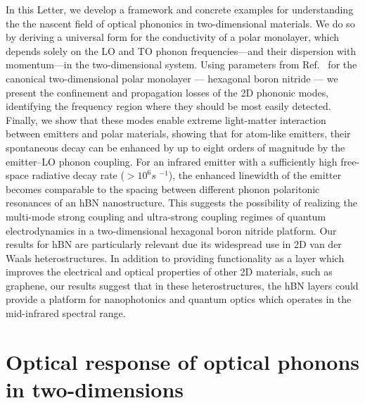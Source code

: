 \documentclass[aps,prb,twocolumn,
	           groupedaddress,superscriptaddress,
               amsfonts,amssymb,amsmath,floatfix,
	           citeautoscript]{revtex4-1}
\newcommand{\comment}[2]{%
    \ifbool{togglecomments}%
    {\textcolor{blue!70!black}{\small\textsf{%
    \textsuperscript{\textsc{\textsf{\MakeLowercase{#1}}}}%
    [#2]}}} %
    {}}     %
\begin{document}
In this Letter, we develop a framework and concrete examples for understanding the the nascent field of optical phononics in two-dimensional materials. We do so by deriving a universal form for the conductivity of a polar monolayer,  which depends solely on the LO and TO phonon frequencies---and their dispersion with momentum---in the two-dimensional system. Using parameters from Ref.~ for the canonical two-dimensional polar monolayer --- hexagonal boron nitride --- we present the confinement and propagation losses of the 2D phononic modes, identifying the frequency region where they should be most easily detected. Finally, we show that these modes enable extreme light-matter interaction between emitters and polar materials, showing that for atom-like emitters, their spontaneous decay can be enhanced by up to eight orders of magnitude by the emitter--LO phonon coupling. For an infrared emitter with a sufficiently high free-space radiative decay rate ($> 10^6 s$ $^{-1}$), the enhanced linewidth of the emitter becomes comparable to the spacing between different phonon polaritonic resonances of an hBN nanostructure. This suggests the possibility of realizing the multi-mode strong coupling and ultra-strong coupling regimes of quantum electrodynamics in a two-dimensional hexagonal boron nitride platform. Our results for hBN are particularly relevant due its widespread use in 2D van der Waals heterostructures. In addition to providing functionality as a layer which improves the electrical and optical properties of other 2D materials, such as graphene, our results suggest that in these heterostructures, the hBN layers could provide a platform for nanophotonics and quantum optics which operates in the mid-infrared spectral range. 


\section{Optical response of optical phonons in two-dimensions}

\end{document}

